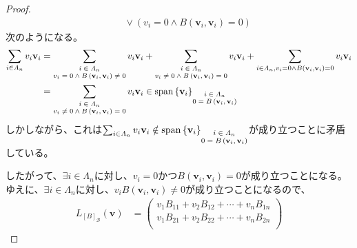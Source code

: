 \documentclass[dvipdfmx]{jsarticle}
\begin{document}
\begin{proof}
\begin{align*}
&\quad \vee \left( v_{i} = 0 \land B\left( \mathbf{v}_{i},\mathbf{v}_{i} \right) = 0 \right)
\end{align*}
次のようになる。
\begin{align*}
\sum_{i \in \varLambda_{n}} {v_{i}\mathbf{v}_{i}} &= \sum_{\scriptsize \begin{matrix} i \in \varLambda_{n} \\v_{i} = 0 \land B\left( \mathbf{v}_{i},\mathbf{v}_{i} \right) \neq 0 \end{matrix}} {v_{i}\mathbf{v}_{i}} + \sum_{\scriptsize \begin{matrix} i \in \varLambda_{n} \\v_{i} \neq 0 \land B\left( \mathbf{v}_{i},\mathbf{v}_{i} \right) = 0 \end{matrix}} {v_{i}\mathbf{v}_{i}} + \sum_{i \in \varLambda_{n} ,v_{i} = 0 \land B\left( \mathbf{v}_{i},\mathbf{v}_{i} \right) = 0 } {v_{i}\mathbf{v}_{i}}\\
&= \sum_{\scriptsize \begin{matrix} i \in \varLambda_{n} \\v_{i} \neq 0 \land B\left( \mathbf{v}_{i},\mathbf{v}_{i} \right) = 0 \end{matrix}} {v_{i}\mathbf{v}_{i}} \in {\mathrm{span}}\left\{ \mathbf{v}_{i} \right\}_{\scriptsize \begin{matrix} i \in \varLambda_{n} \\0 = B\left( \mathbf{v}_{i},\mathbf{v}_{i} \right) \end{matrix}}
\end{align*}
しかしながら、これは$\sum_{i \in \varLambda_{n}} {v_{i}\mathbf{v}_{i}} \notin {\mathrm{span}}\left\{ \mathbf{v}_{i} \right\}_{\scriptsize \begin{matrix} i \in \varLambda_{n} \\0 = B\left( \mathbf{v}_{i},\mathbf{v}_{i} \right) \end{matrix}}$が成り立つことに矛盾している。\par
したがって、$\exists i \in \varLambda_{n}$に対し、$v_{i} = 0$かつ$B\left( \mathbf{v}_{i},\mathbf{v}_{i} \right) = 0$が成り立つことになる。ゆえに、$\exists i \in \varLambda_{n}$に対し、$v_{i}B\left( \mathbf{v}_{i},\mathbf{v}_{i} \right) \neq 0$が成り立つことになるので、
\begin{align*}
L_{[ B]_{\mathcal{B}}}\left( \mathbf{v} \right) &= \begin{pmatrix}
v_{1}B_{11} + v_{2}B_{12} + \cdots + v_{n}B_{1n} \\
v_{1}B_{21} + v_{2}B_{22} + \cdots + v_{n}B_{2n} \\

\end{pmatrix}
\end{align*}
\end{proof}
\end{document}
